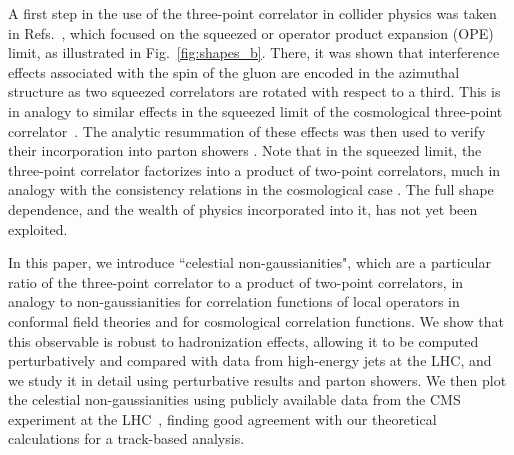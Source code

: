 \documentclass[letterpaper,11pt]{article}
\def\Fig#1{Fig.~{\ref{#1}}}
\DeclareRobustCommand{\Fig}[1]{Fig.~\ref{#1}}
\DeclareRobustCommand{\Refs}[1]{Refs.~\cite{#1}}
\begin{document}
A first step in the use of the three-point correlator in collider physics was taken in \Refs{Chen:2020adz,Chen:2021gdk}, which focused on the squeezed or operator product expansion (OPE) limit, as illustrated in \Fig{fig:shapes_b}.
%
There, it was shown that interference effects associated with the spin of the gluon are encoded in the azimuthal structure as two squeezed correlators are rotated with respect to a third. 
%
This is in analogy to similar effects in the squeezed limit of the cosmological three-point correlator~\cite{Arkani-Hamed:2015bza}.
%
The analytic resummation of these effects \cite{Chen:2020adz,Chen:2021gdk} was then used to verify their incorporation into parton showers \cite{Karlberg:2021kwr}.
%
Note that in the squeezed limit, the three-point correlator factorizes into a product of two-point correlators, much in analogy with the consistency relations in the cosmological case \cite{Maldacena:2002vr,Creminelli:2004yq,Cheung:2007sv,Goldberger:2013rsa}.
%
The full shape dependence, and the wealth of physics incorporated into it, has not yet been exploited. 


In this paper, we introduce ``celestial non-gaussianities", which are a particular ratio of the three-point correlator to a product of two-point correlators, in analogy to non-gaussianities for correlation functions of local operators in conformal field theories and for cosmological correlation functions.
%
We show that this observable is robust to hadronization effects, allowing it to be computed perturbatively and compared with data from high-energy jets at the LHC, and we study it in detail using perturbative results and parton showers.
%
We then plot the celestial non-gaussianities using publicly available data from the CMS experiment at the LHC~\cite{CMS:JetPrimary2011A}, finding good agreement with our theoretical calculations for a track-based analysis.
\end{document}
